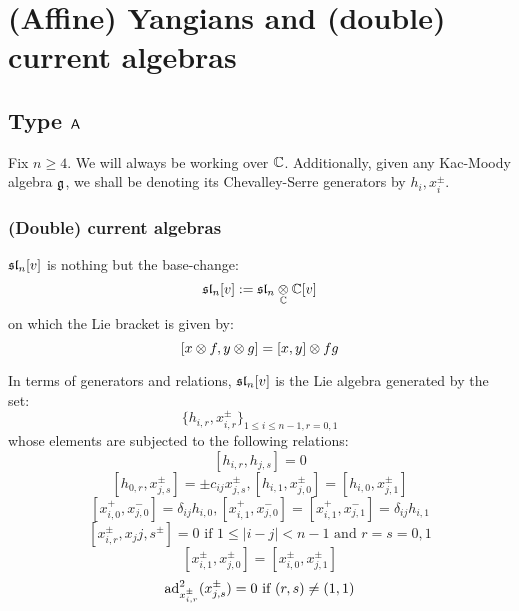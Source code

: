 \section{(Affine) Yangians and (double) current algebras}
    \subsection{Type \texorpdfstring{$\sfA$}{}}
        \begin{convention}
            Fix $n \geq 4$. We will always be working over $\bbC$. Additionally, given any Kac-Moody algebra $\g$, we shall be denoting its Chevalley-Serre generators by $h_i, x_i^{\pm}$. 
        \end{convention}
    
        \subsubsection{(Double) current algebras}
            \begin{definition} \label{def: current_algebra_of_sl_n}
                $\sl_n[v]$ is nothing but the base-change:
                    $$\sl_n[v] := \sl_n \tensor_{\bbC} \bbC[v]$$
                on which the Lie bracket is given by:
                    $$[x \tensor f, y \tensor g] = [x, y] \tensor fg$$
            \end{definition}
            \begin{lemma} \label{lemma: chevalley_serre_presentation_of_the_current_algebra_of_sl_n}
                In terms of generators and relations, $\sl_n[v]$ is the Lie algebra generated by the set:
                    $$\{h_{i, r}, x_{i, r}^{\pm}\}_{1 \leq i \leq n - 1, r = 0, 1}$$
                whose elements are subjected to the following relations:
                    $$[h_{i, r}, h_{j, s}] = 0$$
                    $$[h_{0, r}, x_{j, s}^{\pm}] = \pm c_{ij} x_{j, s}^{\pm}, [h_{i, 1}, x_{j, 0}^{\pm}] = [h_{i, 0}, x_{j, 1}^{\pm}]$$
                    $$[x_{i, 0}^+, x_{j, 0}^-] = \delta_{ij} h_{i, 0}, [x_{i, 1}^+, x_{j, 0}^-] = [x_{i, 1}^+, x_{j, 1}^-] = \delta_{ij} h_{i, 1}$$
                    $$\text{$[x_{i, r}^{\pm}, x_j{j, s}^{\pm}] = 0$ if $1 \leq |i - j| < n - 1$ and $r = s = 0, 1$}$$
                    $$[x_{i, 1}^{\pm}, x_{j, 0}^{\pm}] = [x_{i, 0}^{\pm}, x_{j, 1}^{\pm}]$$
                    $$\text{$\ad_{x_{i, r}^{\pm}}^2( x_{j, s}^{\pm} ) = 0$ if $(r, s) \not = (1, 1)$}$$
            \end{lemma}
